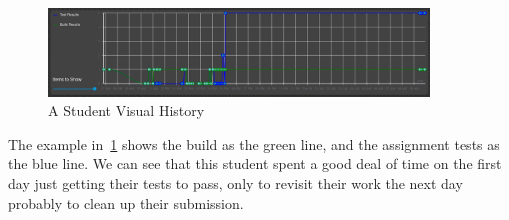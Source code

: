 \begin{figure}[ht]
    \centering
    \includegraphics[width=0.9\textwidth]{figures/student-assignment-visual-history-1}
    \caption{A Student Visual History\label{fig:student-assignment-visual-history-1}}
\end{figure}

The example in~\ref{fig:student-assignment-visual-history-1} shows the build as the green
line, and the assignment tests as the blue line.
We can see that this student spent a good deal of time on the first day
just getting their tests to pass, only to revisit their work the next day probably to
clean up their submission.

